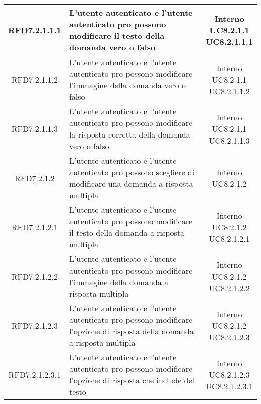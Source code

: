 \begin{longtable}{|c|>{\centering}m{7cm}|c|}
			 \hypertarget{{RFD7.2.1.1.1}}{{RFD7.2.1.1.1}} & L’utente autenticato e l'utente autenticato pro possono modificare il testo della domanda vero o falso & \makecell{Interno\\ UC8.2.1.1 \\UC8.2.1.1.1 } \\ \hline
			 \hypertarget{{RFD7.2.1.1.2}}{{RFD7.2.1.1.2}} & L’utente autenticato e l'utente autenticato pro possono modificare l’immagine della domanda vero o falso & \makecell{Interno\\ UC8.2.1.1 \\UC8.2.1.1.2 } \\ \hline
			 \hypertarget{{RFD7.2.1.1.3}}{{RFD7.2.1.1.3}} & L’utente autenticato e l'utente autenticato pro possono modificare la risposta corretta della domanda vero o falso & \makecell{Interno\\ UC8.2.1.1 \\UC8.2.1.1.3 } \\ \hline
			 \hypertarget{{RFD7.2.1.2}}{{RFD7.2.1.2}} & L’utente autenticato e l’utente autenticato pro possono scegliere di modificare una domanda a risposta multipla & \makecell{Interno\\ UC8.2.1.2 } \\ \hline
			 \hypertarget{{RFD7.2.1.2.1}}{{RFD7.2.1.2.1}} & L’utente autenticato e l'utente autenticato pro possono modificare il testo della domanda a risposta multipla & \makecell{Interno\\ UC8.2.1.2 \\UC8.2.1.2.1 } \\ \hline
			 \hypertarget{{RFD7.2.1.2.2}}{{RFD7.2.1.2.2}} & L’utente autenticato e l'utente autenticato pro possono modificare l’immagine della domanda a risposta multipla & \makecell{Interno\\ UC8.2.1.2 \\UC8.2.1.2.2 } \\ \hline
			 \hypertarget{{RFD7.2.1.2.3}}{{RFD7.2.1.2.3}} & L’utente autenticato e l'utente autenticato pro possono modificare l’opzione di risposta della domanda a risposta multipla & \makecell{Interno\\ UC8.2.1.2 \\UC8.2.1.2.3 } \\ \hline
			 \hypertarget{{RFD7.2.1.2.3.1}}{{RFD7.2.1.2.3.1}} & L’utente autenticato e l'utente autenticato pro possono modificare l’opzione di risposta che include del testo & \makecell{Interno\\ UC8.2.1.2.3 \\UC8.2.1.2.3.1 } \\ \hline

\end{longtable}
